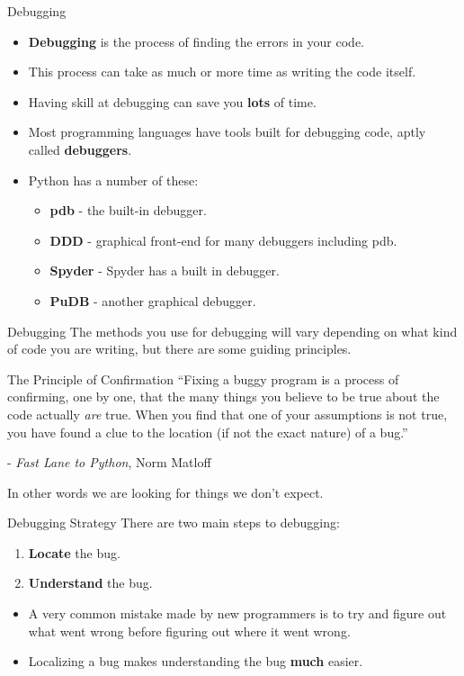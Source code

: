\documentclass[serif,xcolor=pdftex,dvipsnames,table,hyperref={bookmarks=false,breaklinks}]{beamer}
\begin{document}
\begin{frame}[t]{Debugging}
	\begin{itemize}[<+->]
		\item \textbf{Debugging} is the process of finding the errors in your code.
		\item This process can take as much or more time as writing the code itself.
		\item Having skill at debugging can save you \textbf{lots} of time.
		\item Most programming languages have tools built for debugging code, aptly called \textbf{debuggers}.
		\item Python has a number of these:
		\begin{itemize}[<+->]
			\item \textbf{pdb} - the built-in debugger.
			\item \textbf{DDD} - graphical front-end for many debuggers including pdb.
			\item \textbf{Spyder} - Spyder has a built in debugger.
			\item \textbf{PuDB} - another graphical debugger.
		\end{itemize}
	\end{itemize}
\end{frame}

\begin{frame}[t]{Debugging}
	The methods you use for debugging will vary depending on what kind of code you are writing, but there are some guiding principles.
	\pause
	\begin{block}{The Principle of Confirmation}
		``Fixing a buggy program is a process of confirming, one by one, that the many things you believe to be true about the code actually \emph{are} true. When you find that one of your assumptions is not true, you have found a clue to the location (if not the exact nature) of a bug.''
		
		- \emph{Fast Lane to Python}, Norm Matloff
	\end{block}
	
	\pause
	In other words we are looking for things we don't expect.
\end{frame}

\begin{frame}[t]{Debugging Strategy}
	There are two main steps to debugging:
	\pause
	\begin{enumerate}[<+->]
		\item \textbf{Locate} the bug.
		\item \textbf{Understand} the bug.
	\end{enumerate}
	
	\pause 
	\begin{itemize}[<+->]
		\item A very common mistake made by new programmers is to try and figure out what went wrong before figuring out where it went wrong. 
		\item Localizing a bug makes understanding the bug \textbf{much} easier.
	\end{itemize}
\end{frame}
\end{document}
